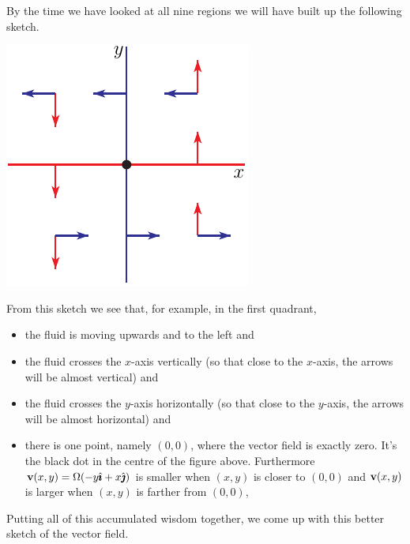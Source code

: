 \begin{eg}
\begin{itemize}
\end{itemize}
By the time we have looked at all nine regions we will have built up the
following sketch.
\begin{fig}\label{fig:vortexCrude}
\begin{center}
    \includegraphics[scale=0.85]{phaseVortex1.pdf}
\end{center}
\end{fig}
\noindent
From this sketch we see that, for example, in the first quadrant, 
\begin{itemize}\itemsep1pt \parskip0pt  %
\item
   the fluid is moving upwards and to the left and
\item
   the fluid crosses the $x$-axis vertically (so that close to the $x$-axis, 
   the arrows will be almost vertical) and
\item
   the fluid crosses the $y$-axis horizontally (so that close to the $y$-axis, 
   the arrows will be almost horizontal) and
\item
   there is one point, namely $(0,0)$, where the vector field is exactly 
   zero. It's the black dot in the centre of the figure above. Furthermore
   $\mathbf{v}(x,y)=\Omega(-y\hat{\pmb{\imath}}+x\hat{\pmb{\jmath}})$ is smaller when $(x,y)$ is closer to $(0,0)$ 
   and  $\mathbf{v}(x,y)$ is larger when $(x,y)$ is farther from $(0,0)$, 
\end{itemize}
Putting all of this accumulated wisdom together, we come up with this better 
sketch of the vector field.
\begin{fig}\label{fig:vortexField}
\begin{center}

\end{center}
\end{fig}
\end{eg}
